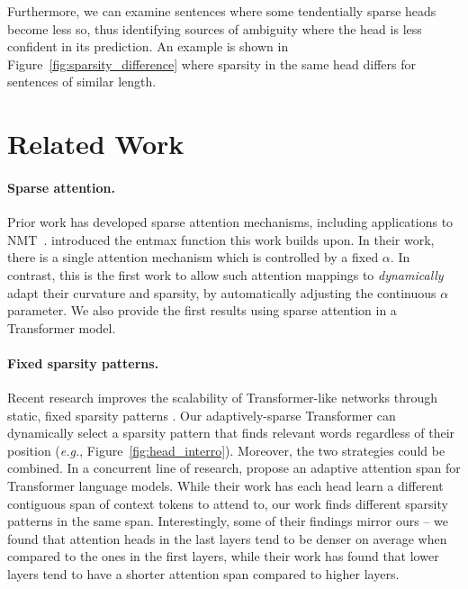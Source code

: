 \documentclass[11pt,a4paper]{article}
\makeatletter
\newcommand*{\eg}{\textit{e.\hspace{.07em}g.}\@\xspace}
\newcommand{\figref}[1]{Figure~\ref{fig:#1}}
\newcommand*\entmaxtext{entmax\xspace}
\makeatother
\begin{document}
Furthermore, we can examine sentences where some tendentially sparse
heads become less so, thus identifying sources of ambiguity where the
head is less confident in its prediction. An example is shown in
\figref{sparsity_difference} where sparsity in the same head differs
for sentences of similar length.

\section{Related Work}\label{sec:related}

\paragraph{Sparse attention.}
Prior work has developed sparse attention mechanisms, including
applications to NMT~\citep{sparsemax, malaviya2018sparse, fusedmax,
shao2019ssn, maruf2019selective}. \citet{entmax} introduced the
\entmaxtext function this work builds upon. In their work, there is a
single attention mechanism which is controlled by a fixed $\alpha$.
In contrast, this is the first work to allow such attention mappings
to \emph{dynamically} adapt their curvature and sparsity, by
automatically adjusting the continuous $\alpha$ parameter. We also
provide the first results using sparse attention in a Transformer
model.

\paragraph{Fixed sparsity patterns.}
Recent research improves the scalability of Transformer-like networks
through static, fixed sparsity patterns
\citep{openai_sparse_transf,dynamic_conv}. Our adaptively-sparse
Transformer can dynamically select a sparsity pattern that finds
relevant words regardless of their position (\eg,
\figref{head_interro}). Moreover, the two strategies could be
combined. In a concurrent line of research, \citet{Sukhbaatar2019}
propose an adaptive attention span for Transformer language models.
While their work has each head learn a different contiguous span of
context tokens to attend to, our work finds different sparsity
patterns in the same span. Interestingly, some of their findings
mirror ours -- we found that attention heads in the last layers tend
to be denser on average when compared to the ones in the first
layers, while their work has found that lower layers tend to have a
shorter attention span compared to higher layers.
\end{document}
